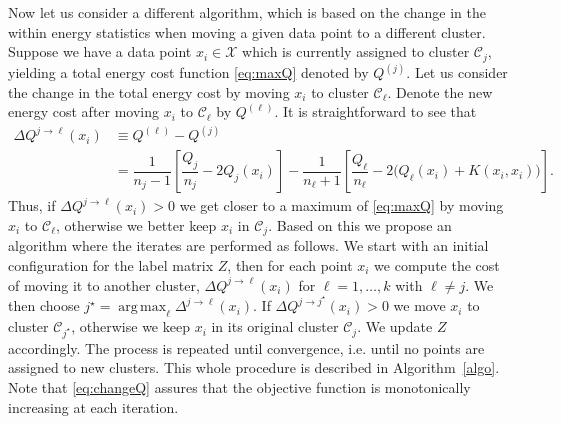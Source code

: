 \documentclass[aps,preprint,nofootinbib,floatfix]{revtex4-1}
\DeclareMathOperator*{\argmax}{arg\,max}
\newcommand\kk{K}
\newcommand\C{{\mathcal{C}}}
\begin{document}
Now let us consider a different algorithm, which is based on the change
in the within energy statistics when moving a given data point to
a different cluster.
Suppose we have a data point $x_i \in \mathcal{X}$
which is currently assigned to  cluster $\C_j$, yielding
a total energy cost function \eqref{eq:maxQ} denoted by $Q^{(j)}$.
Let us consider the change in the total energy cost by moving
$x_i$ to cluster $\C_\ell$. 
Denote the new energy cost after moving $x_i$ to $\C_\ell$ by $Q^{(\ell)}$.
It is straightforward to see that
\begin{equation}
\label{eq:changeQ}
\begin{split}
\Delta Q^{j \to \ell}(x_i) &\equiv Q^{(\ell)} - Q^{(j)} \\ 
&= 
\dfrac{1}{n_j - 1}\left[ \dfrac{Q_j}{n_j} - 2 Q_j(x_i) \right]
- \dfrac{1}{n_\ell + 1}\left[ \dfrac{Q_\ell}{n_\ell} - 2 \big(Q_\ell(x_i) + 
\kk(x_i,x_i)\big) 
\right].
\end{split}
\end{equation}
Thus, if $\Delta Q^{j\to \ell}(x_i) > 0$ we get closer to a 
maximum of \eqref{eq:maxQ} by
moving $x_i$ to $\C_\ell$, otherwise we better keep $x_i$ in $\C_j$. Based on
this we propose an algorithm where
the iterates are performed as follows.
We start with an initial configuration for the label matrix $Z$, 
then for each
point $x_i$ 
we compute the cost of moving it to another cluster,
$\Delta Q^{j\to \ell}(x_i)$ for 
$\ell=1,\dots,k$ with $\ell \ne j$. 
We then choose $j^\star = \argmax_\ell \Delta^{j \to \ell}(x_i)$.
If $\Delta Q^{j \to j^\star}(x_i) > 0$ 
we move $x_i$ to cluster $\C_{j^\star}$, otherwise 
we keep $x_i$ in its original cluster $\C_j$. We update $Z$ accordingly.
The process is repeated
until convergence, i.e. until no points are assigned to new clusters. 
This whole procedure is described in Algorithm~\ref{algo}.
Note that \eqref{eq:changeQ} assures that the objective function is
monotonically increasing at each iteration.
\end{document}
